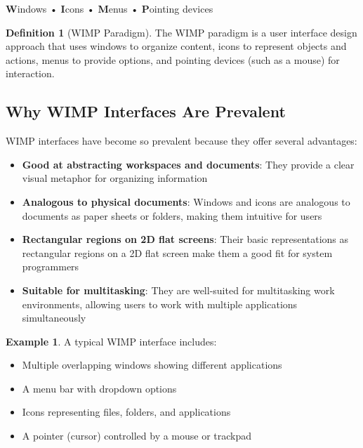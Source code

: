 \documentclass[11pt,a4paper]{article}
\theoremstyle{definition}
\newtheorem{definition}{Definition}[section]
\newtheorem{example}{Example}[section]
\theoremstyle{plain}
\theoremstyle{remark}
\begin{document}
\begin{tcolorbox}[colback=blue!5!white,colframe=blue!75!black,title=\textbf{WIMP Paradigm}]
\begin{center}
\textbf{W}indows • \textbf{I}cons • \textbf{M}enus • \textbf{P}ointing devices
\end{center}
\end{tcolorbox}

\begin{definition}[WIMP Paradigm]
The WIMP paradigm is a user interface design approach that uses windows to organize content, icons to represent objects and actions, menus to provide options, and pointing devices (such as a mouse) for interaction.
\end{definition}

\subsection{Why WIMP Interfaces Are Prevalent}

WIMP interfaces have become so prevalent because they offer several advantages:

\begin{itemize}
    \item \textbf{Good at abstracting workspaces and documents}: They provide a clear visual metaphor for organizing information
    \item \textbf{Analogous to physical documents}: Windows and icons are analogous to documents as paper sheets or folders, making them intuitive for users
    \item \textbf{Rectangular regions on 2D flat screens}: Their basic representations as rectangular regions on a 2D flat screen make them a good fit for system programmers
    \item \textbf{Suitable for multitasking}: They are well-suited for multitasking work environments, allowing users to work with multiple applications simultaneously
\end{itemize}

\begin{example}
A typical WIMP interface includes:
\begin{itemize}
    \item Multiple overlapping windows showing different applications
    \item A menu bar with dropdown options
    \item Icons representing files, folders, and applications
    \item A pointer (cursor) controlled by a mouse or trackpad
\end{itemize}
\end{example}
\end{document}
